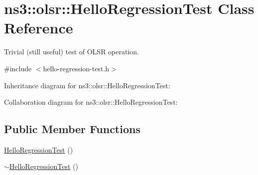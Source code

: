 \hypertarget{classns3_1_1olsr_1_1HelloRegressionTest}{}\section{ns3\+:\+:olsr\+:\+:Hello\+Regression\+Test Class Reference}
\label{classns3_1_1olsr_1_1HelloRegressionTest}


Trivial (still useful) test of O\+L\+SR operation.  




{\ttfamily \#include $<$hello-\/regression-\/test.\+h$>$}



Inheritance diagram for ns3\+:\+:olsr\+:\+:Hello\+Regression\+Test\+:


Collaboration diagram for ns3\+:\+:olsr\+:\+:Hello\+Regression\+Test\+:
\subsection*{Public Member Functions}
\begin{DoxyCompactItemize}
\item 
\hyperlink{classns3_1_1olsr_1_1HelloRegressionTest_a4fecb7d5be2443d0345390f4fefd8761}{Hello\+Regression\+Test} ()
\item 
\hyperlink{classns3_1_1olsr_1_1HelloRegressionTest_a9d399221c3fc5f61803d0e65a066264d}{$\sim$\+Hello\+Regression\+Test} ()
\end{DoxyCompactItemize}
